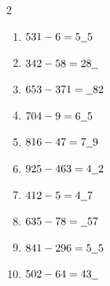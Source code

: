\documentclass{article}
\begin{document}
\begin{multicols}{2}
\begin{enumerate}[label=\arabic*., leftmargin=*, itemsep=0.9em]
  \item $531 - 6 = 5\underline{\hspace{0.6em}}5$\\[0.6em]

  \item $342 - 58 = 28\underline{\hspace{0.6em}}$\\[0.6em]

  \item $653 - 371 = \underline{\hspace{0.6em}}82$\\[0.6em]

  \item $704 - 9 = 6\underline{\hspace{0.6em}}5$\\[0.6em]

  \item $816 - 47 = 7\underline{\hspace{0.6em}}9$\\[0.6em]

  \item $925 - 463 = 4\underline{\hspace{0.6em}}2$\\[0.6em]

  \item $412 - 5 = 4\underline{\hspace{0.6em}}7$\\[0.6em]

  \item $635 - 78 = \underline{\hspace{0.6em}}57$\\[0.6em]

  \item $841 - 296 = 5\underline{\hspace{0.6em}}5$\\[0.6em]

  \item $502 - 64 = 43\underline{\hspace{0.6em}}$\\[0.6em]

\end{enumerate}
\end{multicols}
\end{document}

